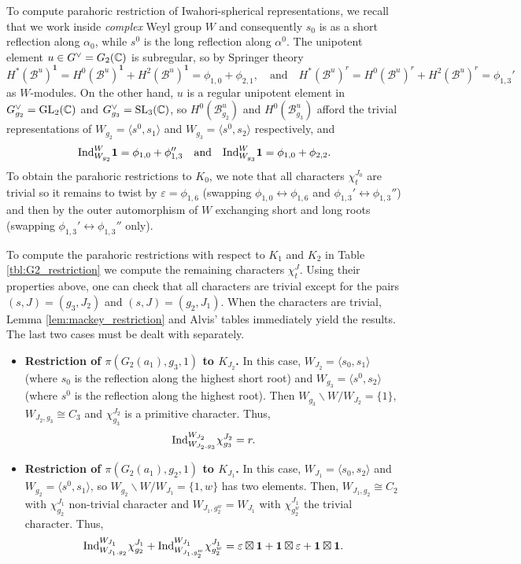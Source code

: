 To compute parahoric restriction of Iwahori-spherical representations, we recall that we work inside \textit{complex} Weyl group $W$ and consequently $s_0$ is as a short reflection along $\alpha_0$, while $s^0$ is the long reflection along $\alpha^0$. The unipotent element $u\in G^\vee=G_2(\mathbb{C})$ is subregular, so by Springer theory
$$H^*(\mathcal{B}^u)^\mathbf{1}=H^0(\mathcal{B}^u)^\mathbf{1}+H^2(\mathcal{B}^u)^\mathbf{1}=\phi_{1,0}+\phi_{2,1},\quad\text{and}\quad H^*(\mathcal{B}^u)^r=H^0(\mathcal{B}^u)^r+H^2(\mathcal{B}^u)^r=\phi_{1,3}'$$
as $W$-modules. On the other hand, $u$ is a regular unipotent element in $G^\vee_{g_2}=\mathrm{GL}_2(\mathbb{C})$ and $G^\vee_{g_3}=\mathrm{SL}_3(\mathbb{C})$, so $H^0(\mathcal{B}_{g_2}^u)$ and $H^0(\mathcal{B}_{g_3}^u)$ afford the trivial representations of $W_{g_2}=\langle s^0,s_1\rangle$ and $W_{g_3}=\langle s^0,s_2\rangle$ respectively, and
$$\mathrm{Ind}_{W_{g_2}}^W\mathbf{1}=\phi_{1,0}+\phi_{1,3}''\quad\text{and}\quad\mathrm{Ind}_{W_{g_3}}^W\mathbf{1}=\phi_{1,0}+\phi_{2,2}.$$
To obtain the parahoric restrictions to $K_0$, we note that all characters $\chi_t^{J_0}$ are trivial so it remains to twist by $\varepsilon=\phi_{1,6}$ (swapping $\phi_{1,0}\leftrightarrow\phi_{1,6}$ and $\phi_{1,3}'\leftrightarrow\phi_{1,3}''$) and then by the outer automorphism of $W$ exchanging short and long roots (swapping $\phi_{1,3}'\leftrightarrow\phi_{1,3}''$ only). 

To compute the parahoric restrictions with respect to $K_1$ and $K_2$ in Table \ref{tbl:G2_restriction} we compute the remaining characters $\chi_t^J$. Using their properties above, one can check that all characters are trivial except for the pairs $(s,J)=(g_3,J_2)$ and $(s,J)=(g_2,J_1)$. When the characters are trivial, Lemma \ref{lem:mackey_restriction} and Alvis' tables immediately yield the results. The last two cases must be dealt with separately.
\begin{itemize}
    \item \textbf{Restriction of $\pi(G_2(a_1),g_3,1)$ to $K_{J_2}$.} In this case, $W_{J_2}=\langle s_0,s_1\rangle$ (where $s_0$ is the reflection along the highest short root) and $W_{g_3}=\langle s^0,s_2\rangle$ (where $s^0$ is the reflection along the highest root). Then $W_{g_3}\backslash W/W_{J_2}=\{1\}$, $W_{J_2,g_3}\cong C_3$ and $\chi_{g_3}^{J_2}$ is a primitive character. Thus, 
    $$\mathrm{Ind}_{W_{J_2,g_3}}^{W_{J_2}}\chi_{g_3}^{J_2}=r.$$ 
    \item \textbf{Restriction of $\pi(G_2(a_1),g_2,1)$ to $K_{J_1}$.} In this case, $W_{J_1}=\langle s_0,s_2\rangle$ and $W_{g_2}=\langle s^0,s_1\rangle$, so $W_{g_2}\backslash W/W_{J_1}=\{1,w\}$ has two elements. Then, $W_{J_1,g_2}\cong C_2$ with $\chi_{g_2}^{J_1}$ non-trivial character and $W_{J_1,g_2^w}=W_{J_1}$ with $\chi_{g_2^w}^{J_1}$ the trivial character. Thus,
    $$\mathrm{Ind}_{W_{J_1,g_2}}^{W_{J_1}}\chi_{g_2}^{J_1}+\mathrm{Ind}_{W_{J_1,g_2^w}}^{W_{J_1}}\chi_{g_2^w}^{J_1}=\varepsilon\boxtimes\mathbf{1}+\mathbf{1}\boxtimes\varepsilon+\mathbf{1}\boxtimes\mathbf{1}.$$ 
\end{itemize}

